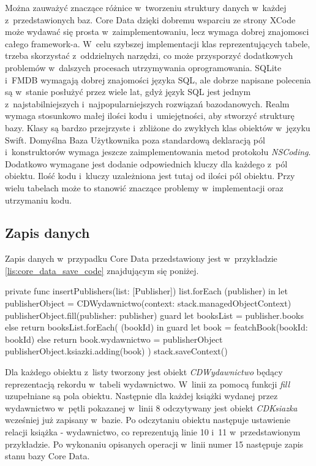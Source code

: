 \newpage
Można zauważyć znaczące różnice w~tworzeniu struktury danych w~każdej z~przedstawionych baz. Core Data dzięki dobremu wsparciu ze strony XCode może wydawać się prosta w~zaimplementowaniu, lecz wymaga dobrej znajomosci całego framework-a. W~celu szybszej implementacji klas reprezentujących tabele, trzeba skorzystać z~oddzielnych narzędzi, co może przysporzyć dodatkowych problemów w~dalszych procesach utrzymywania oprogramowania. SQLite i~FMDB wymagają dobrej znajomości języka SQL, ale dobrze napisane polecenia są w~stanie posłużyć przez wiele lat, gdyż język SQL jest jednym z~najstabilniejszych i~najpopularniejszych rozwiązań bazodanowych. Realm wymaga stosunkowo małej ilości kodu i~umiejętności, aby stworzyć strukturę bazy. Klasy są bardzo przejrzyste i~zbliżone do zwykłych klas obiektów w~języku Swift. Domyślna Baza Użytkownika poza standardową deklaracją pól i~konstruktorów wymaga jeszcze zaimplementowania metod protokołu \textit{NSCoding}. Dodatkowo wymagane jest dodanie odpowiednich kluczy dla każdego z~pól obiektu. Ilość kodu i~kluczy uzależniona jest tutaj od ilości pól obiektu. Przy wielu tabelach może to stanowić znaczące problemy w~implementacji oraz utrzymaniu kodu. 

\newpage
\subsection{Zapis danych}

Zapis danych w~przypadku Core Data przedstawiony jest w~przykładzie \ref{lis:core_data_save_code} znajdującym się poniżej.

\begin{code}[
		language=swift,
		caption={Przykład zapisu obiektu Core Data},
		label={lis:core_data_save_code},
	]
    private func insertPublishers(list: [Publisher]) {
        list.forEach { (publisher) in
            let publisherObject = CDWydawnictwo(context: stack.managedObjectContext)
            publisherObject.fill(publisher: publisher)
            guard let booksList = publisher.books else { return }
            booksList.forEach({ (bookId) in
                guard let book = featchBook(bookId: bookId) else { return }
                book.wydawnictwo = publisherObject
                publisherObject.ksiazki.adding(book)
            })
        }
        stack.saveContext()
    }
\end{code}
\bigskip

Dla każdego obiektu z~listy tworzony jest obiekt \textit{CDWydawnictwo} będący reprezentacją rekordu w~tabeli wydawnictwo. W~linii za pomocą funkcji \textit{fill} uzupełniane są pola obiektu. Następnie dla każdej książki wydanej przez wydawnictwo w~pętli pokazanej w~linii 8 odczytywany jest obiekt \textit{CDKsiazka} wcześniej już zapisany w~bazie. Po odczytaniu obiektu następuje ustawienie relacji książka - wydawnictwo, co reprezentują linie 10 i~11 w~przedstawionym przykładzie. Po wykonaniu opisanych operacji w~linii numer 15 następuje zapis stanu bazy Core Data. 

